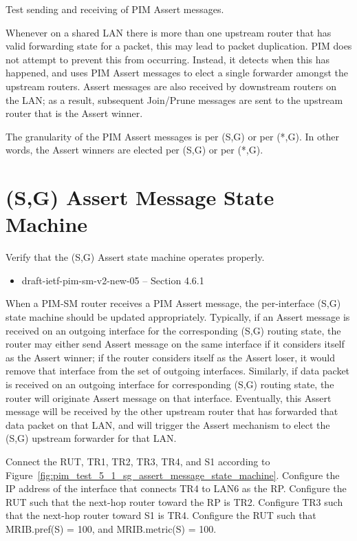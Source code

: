 \documentclass[11pt]{report}
\begin{document}
Test sending and receiving of PIM Assert messages.

Whenever on a shared LAN there is more than one upstream router that has valid
forwarding state for a packet, this may lead to packet duplication.
PIM does not attempt to prevent this from occurring. Instead, it detects when
this has happened, and uses PIM Assert messages to elect a single forwarder
amongst the upstream routers. Assert messages are also received by downstream
routers on the LAN; as a result, subsequent Join/Prune messages are sent to
the upstream router that is the Assert winner.

The granularity of the PIM Assert messages is per (S,G) or per (*,G).
In other words, the Assert winners are elected per (S,G) or per (*,G).


\newpage
\section{(S,G) Assert Message State Machine}

Verify that the (S,G) Assert state machine operates properly.

\begin{itemize}
  \item draft-ietf-pim-sm-v2-new-05 -- Section 4.6.1
\end{itemize}

When a PIM-SM router receives a PIM Assert message, the per-interface
(S,G) state machine should be updated appropriately. Typically, if an
Assert message is received on an outgoing interface for the corresponding
(S,G) routing state, the router may either send Assert message on the
same interface if it considers itself as the Assert winner; if the router
considers itself as the Assert loser, it would remove that interface from the
set of outgoing interfaces. Similarly, if data packet is received on an
outgoing interface for corresponding (S,G) routing state, the router will
originate Assert message on that interface. Eventually, this Assert message
will be received by the other upstream router that has forwarded that data
packet on that LAN, and will trigger the Assert mechanism to elect the (S,G)
upstream forwarder for that LAN.

Connect the RUT, TR1, TR2, TR3, TR4, and S1 according to
Figure~\ref{fig:pim_test_5_1_sg_assert_message_state_machine}.
Configure the IP address of the interface that connects TR4 to LAN6 as the RP.
Configure the RUT such that the next-hop router toward the RP is TR2.
Configure TR3 such that the next-hop router toward S1 is TR4.
Configure the RUT such that MRIB.pref(S) = 100, and MRIB.metric(S) = 100.
\end{document}
